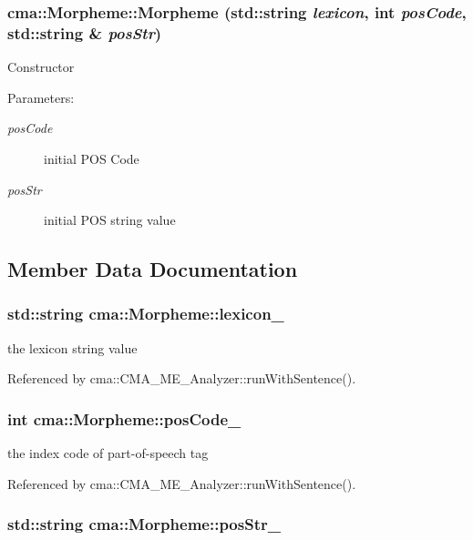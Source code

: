 \subsubsection[{Morpheme}]{\setlength{\rightskip}{0pt plus 5cm}cma::Morpheme::Morpheme (std::string {\em lexicon}, \/  int {\em posCode}, \/  std::string \& {\em posStr})}\label{structcma_1_1Morpheme_12e84d0109bff5f66e4d72a78fbd19b4}


Constructor \begin{Desc}
\item[Parameters:]
\begin{description}
\item[{\em posCode}]initial POS Code \item[{\em posStr}]initial POS string value \end{description}
\end{Desc}


\subsection{Member Data Documentation}
\subsubsection[{lexicon\_\-}]{\setlength{\rightskip}{0pt plus 5cm}std::string {\bf cma::Morpheme::lexicon\_\-}}\label{structcma_1_1Morpheme_1054ad519e1ebb80ec71cd21b8ad2a78}


the lexicon string value 

Referenced by cma::CMA\_\-ME\_\-Analyzer::runWithSentence().
\subsubsection[{posCode\_\-}]{\setlength{\rightskip}{0pt plus 5cm}int {\bf cma::Morpheme::posCode\_\-}}\label{structcma_1_1Morpheme_883d0df2e303ce7bd5953bfa913a88ef}


the index code of part-of-speech tag 

Referenced by cma::CMA\_\-ME\_\-Analyzer::runWithSentence().
\subsubsection[{posStr\_\-}]{\setlength{\rightskip}{0pt plus 5cm}std::string {\bf cma::Morpheme::posStr\_\-}}\label{structcma_1_1Morpheme_21b273edef21e9efd50956f926cdaeab}


